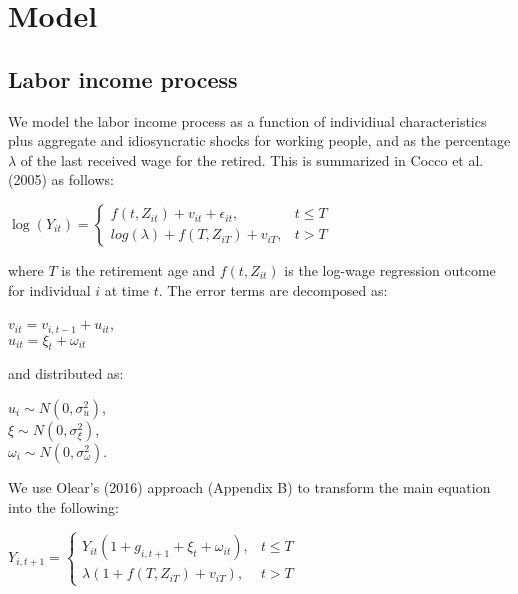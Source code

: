 \chapter{Model}
\label{model}

\section{Labor income process}

We model the labor income process as a function of individiual characteristics plus aggregate and idiosyncratic shocks for working people, and as the percentage $\lambda$ of the last received wage for the retired. This is summarized in Cocco et al. (2005) as follows:

\begin{center}
	$\log(Y_{it}) =
		\begin{cases}
			f(t,Z_{it}) + v_{it} + \epsilon_{it}, & t \leq T \\
			log(\lambda) + f(T, Z_{iT}) + v_{iT}, & t > T
		\end{cases}
	$
\end{center}

where $T$ is the retirement age and $f(t, Z_{it})$ is the log-wage regression outcome for individual $i$ at time $t$. The error terms are decomposed as:

\begin{center}
	$v_{it} = v_{i,t-1} + u_{it}$,\\
	$u_{it} = \xi_t + \omega_{it}$
\end{center}

and distributed as:

\begin{center}
	$u_{i} \sim N(0, \sigma^2_u)$,\\
	$\xi \sim N(0,\sigma^2_{\xi})$,\\
	$\omega_{i} \sim N(0, \sigma^2_{\omega})$.
\end{center}

We use Olear's (2016) approach (Appendix B) to transform the main equation into the following:

\begin{center}
	$Y_{i,t+1} = 
	\begin{cases}
		Y_{it} (1 + g_{i,t+1} + \xi_t + \omega_{it}), & t \leq T \\
		\lambda (1 + f(T, Z_{iT}) + v_{iT}), & t > T
	\end{cases}	
	$
\end{center}

